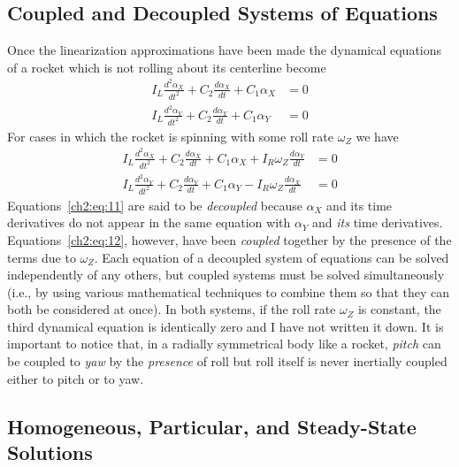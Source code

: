 \subsection{Coupled and Decoupled Systems of Equations}\label{ch2:sec:2.3}

Once the linearization approximations have been made the dynamical equations
of a rocket which is not rolling about its centerline become
\begin{equation}\label{ch2:eq:11}
\begin{aligned}
I_L \frac{d^{2}\alpha_X}{dt^{2}} + C_2 \frac{d\alpha_X}{dt} + C_1\alpha_X &= 0\\
I_L \frac{d^{2}\alpha_Y}{dt^{2}} + C_2 \frac{d\alpha_Y}{dt} + C_1\alpha_Y &= 0
\end{aligned}
\end{equation}
For cases in which the rocket is spinning with some roll rate $\omega_Z$ we
have
\begin{equation}\label{ch2:eq:12}
\begin{aligned}
I_L \frac{d^{2}\alpha_X}{dt^{2}} + C_2 \frac{d\alpha_X}{dt} + C_1\alpha_X
    + I_R\omega_Z \frac{d\alpha_Y}{dt} &= 0\\
I_L \frac{d^{2}\alpha_Y}{dt^{2}} + C_2 \frac{d\alpha_Y}{dt} + C_1\alpha_Y
    - I_R\omega_Z \frac{d\alpha_X}{dt} &= 0
\end{aligned}
\end{equation}
Equations~\eqref{ch2:eq:11} are said to be \emph{decoupled} because $\alpha_X$
and its time derivatives do not appear in the same equation with $\alpha_Y$
and \emph{its} time derivatives. Equations~\eqref{ch2:eq:12}, however, have
been \emph{coupled} together by the presence of the terms due to $\omega_Z$.
Each equation of a decoupled system of equations can be solved independently
of any others, but coupled systems must be solved simultaneously (i.e., by
using various mathematical techniques to combine them so that they can both be
considered at once). In both systems, if the roll rate $\omega_Z$ is constant,
the third dynamical equation is identically zero and I have not written it
down. It is important to notice that, in a radially symmetrical body like a
rocket, \emph{pitch} can be coupled to \emph{yaw} by the \emph{presence} of
roll but roll itself is never inertially coupled either to pitch or to yaw.

\subsection{Homogeneous, Particular, and Steady-State Solutions}\label{ch2:sec:2.4}

